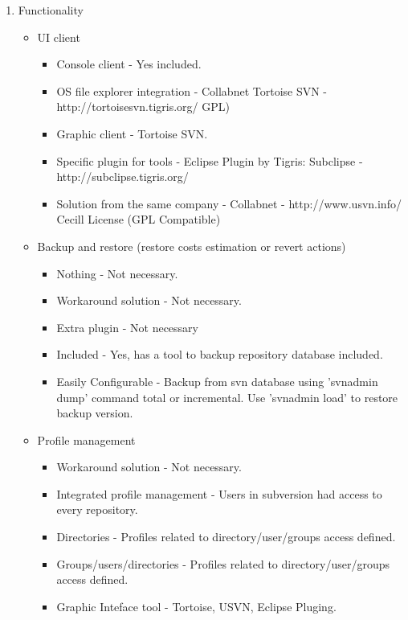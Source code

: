 \documentclass[11pt]{scrartcl}
\begin{document}
\begin{enumerate}
    \item Functionality
        \begin{itemize}
	    \item UI client
            \begin{itemize}
                \item Console client - Yes included.
                \item OS file explorer integration - Collabnet Tortoise SVN - http://tortoisesvn.tigris.org/ GPL)
                \item Graphic client - Tortoise SVN.
                \item Specific plugin for tools - Eclipse Plugin by Tigris: Subclipse - http://subclipse.tigris.org/
                \item Solution from the same company - Collabnet - http://www.usvn.info/ Cecill License (GPL Compatible)
            \end{itemize}
	    \item Backup and restore (restore costs estimation or revert actions)
            \begin{itemize}
                \item Nothing - Not necessary.
                \item Workaround solution - Not necessary.
                \item Extra plugin - Not necessary
                \item Included - Yes, has a tool to backup repository database included.
                \item Easily Configurable - Backup from svn database using 'svnadmin dump' command total or incremental. Use 'svnadmin load' to restore backup version.
            \end{itemize}

	    \item Profile management 
            \begin{itemize}
                \item Workaround solution - Not necessary.
                \item Integrated profile management - Users in subversion had access to every repository.
                \item Directories - Profiles related to directory/user/groups access defined.
                \item Groups/users/directories - Profiles related to directory/user/groups access defined.
                \item Graphic Inteface tool - Tortoise, USVN, Eclipse Pluging.
            \end{itemize}
        \end{itemize}


\end{enumerate}
\end{document}
